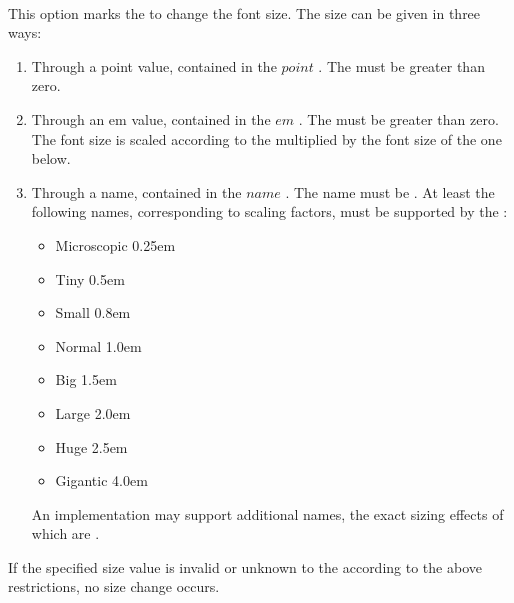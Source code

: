  \\

This option marks the  to change the font size. The size can be given in three ways:
\begin{enumerate}
\item Through a point value, contained in the \inline$point$ . The  must be greater than zero.
\item Through an em value, contained in the \inline$em$ . The  must be greater than zero. The font size is scaled according to the  multiplied by the font size of the  one  below.
\item Through a name, contained in the \inline$name$ . The name must be . At least the following names, corresponding to scaling factors, must be supported by the :
  \begin{itemize}[noitemsep]
  \item Microscopic 0.25em
  \item Tiny 0.5em
  \item Small 0.8em
  \item Normal 1.0em
  \item Big 1.5em
  \item Large 2.0em
  \item Huge 2.5em
  \item Gigantic 4.0em
  \end{itemize}
  An implementation may support additional names, the exact sizing effects of which are .
\end{enumerate}
If the specified size value is invalid or unknown to the  according to the above restrictions, no size change occurs. \\

\begin{examples}
\end{examples}

